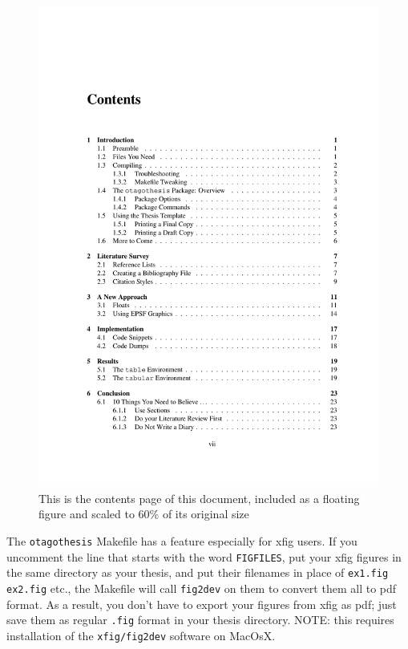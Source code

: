 \begin{figure}[tb]
\begin{center}
\includegraphics[scale = 0.6, angle = 90]{page.pdf}
\caption[A PDF page included as a figure.]{This is the contents
page of this document, included as a floating figure and scaled to
60\% of its original size}
\label{fig:page}
\end{center}
\end{figure}

The \verb|otagothesis| Makefile has a feature especially for xfig
users.  If you uncomment the line that starts with the word
\verb|FIGFILES|, put your xfig figures in the same directory as
your thesis, and put their filenames in place of
\verb|ex1.fig ex2.fig| etc., the Makefile will call \verb|fig2dev| on
them to convert them all to pdf format.  As a result, you don't have
to export your figures from xfig as pdf; just save them as regular
\verb|.fig| format in your thesis directory.  NOTE: this requires
installation of the \verb|xfig/fig2dev| software on MacOsX.

